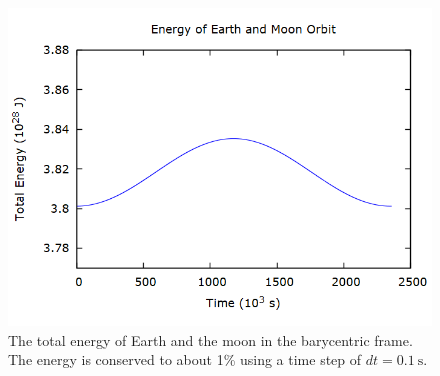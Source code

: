 \documentclass[aps,prl,twocolumn,superscriptaddress]{revtex4-1}
\begin{document}
\begin{figure}[htbp]
  	\begin{center}
 		\includegraphics[scale=0.3]{orbit_energy.png}
  		\caption{The total energy of Earth and the moon in the barycentric frame. The energy is conserved to about 1\% using a time step of $dt = \SI{0.1}{\s}$.}
  		\label{gr:energy}
 	\end{center}
\end{figure}
\end{document}
